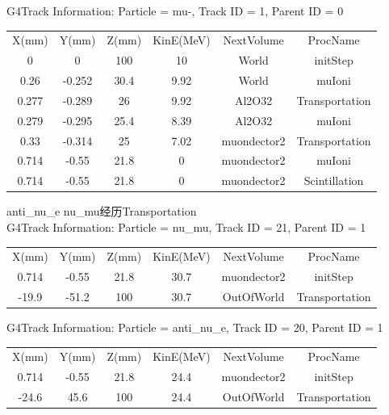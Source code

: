 \documentclass[UTF8]{ctexart}
\begin{document}
G4Track Information: Particle = mu-, Track ID = 1,  Parent ID = 0\\
\begin{center}
\begin{tabular}{|c|c|c|c|c|c|}
 X(mm) & Y(mm) & Z(mm) & KinE(MeV)  & NextVolume & ProcName\\
 0    &  0      &  100  &  10   &       World &  initStep\\
 0.26 & -0.252  &  30.4 & 9.92  &        World &  muIoni\\
0.277  & -0.289 &   26 &  9.92  &   Al2O32 & Transportation\\
0.279 & -0.295  &  25.4 & 8.39  &     Al2O32  & muIoni\\
0.33 & -0.314  &    25 &  7.02 &    muondector2  & Transportation\\
0.714 &  -0.55 &  21.8 &  0    &    muondector2  & muIoni\\
0.714 & -0.55  &   21.8 &  0     & muondector2 & Scintillation

\end{tabular}
\end{center}

anti\_nu\_e nu\_mu经历Transportation\\

G4Track Information:   Particle = nu\_mu,   Track ID = 21,   Parent ID = 1\\

\begin{center}
\begin{tabular}{|c|c|c|c|c|c|}
X(mm) & Y(mm) & Z(mm) & KinE(MeV)  & NextVolume & ProcName\\
0.714 & -0.55 &  21.8 & 30.7 &   muondector2 & initStep\\
-19.9 &   -51.2  &    100   &   30.7  & OutOfWorld  & Transportation

\end{tabular}
\end{center}

G4Track Information:   Particle =  anti\_nu\_e,   Track ID = 20,   Parent ID = 1\\

\begin{center}
\begin{tabular}{|c|c|c|c|c|c|}
X(mm) & Y(mm) & Z(mm) & KinE(MeV)  & NextVolume & ProcName\\
0.714 & -0.55 &  21.8 & 24.4 &   muondector2 & initStep\\
-24.6 &   45.6  &    100   &   24.4  & OutOfWorld  & Transportation

\end{tabular}
\end{center}
\end{document}
